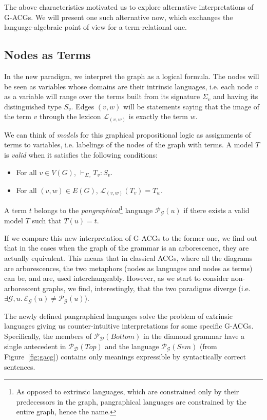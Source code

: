 \documentclass{llncs}
\begin{document}
The above characteristics motivated us to explore alternative interpretations
of G-ACGs. We will present one such alternative now, which exchanges the
language-algebraic point of view for a term-relational one.

\subsection{Nodes as Terms}

In the new paradigm, we interpret the graph as a logical formula. The nodes
will be seen as variables whose domains are their intrinsic languages,
i.e. each node $v$ as a variable will range over the terms built from its
signature $\Sigma_v$ and having its distinguished type $S_v$. Edges $(v,w)$
will be statements saying that the image of the term $v$ through the lexicon
$\mathcal{L}_{(v,w)}$ is exactly the term $w$.

We can think of \emph{models} for this graphical propositional logic as
assignments of terms to variables, i.e. labelings of the nodes of the graph
with terms. A model $T$ is \emph{valid} when it satisfies the following
conditions:

\begin{itemize}
  \item For all $v \in V(G)$, $\vdash_{\Sigma_v} T_v : S_v$.
  \item For all $(v,w) \in E(G)$, $\mathcal{L}_{(v,w)}(T_v) = T_w$.
\end{itemize}

A term $t$ belongs to the \emph{pangraphical}\footnote{As opposed to extrinsic
  languages, which are constrained only by their predecessors in the graph,
  pangraphical languages are constrained by the entire graph, hence the name.}
language $\mathcal{P}_{\mathcal{G}}(u)$ if there exists a valid model $T$ such
that $T(u) = t$.

If we compare this new interpretation of G-ACGs to the former one, we find out
that in the cases when the graph of the grammar is an arborescence, they are
actually equivalent. This means that in classical ACGs, where all the diagrams
are arborescences, the two metaphors (nodes as languages and nodes as terms)
can be, and are, used interchangeably. However, as we start to consider
non-arborescent graphs, we find, interestingly, that the two paradigms diverge
(i.e. $\exists \mathcal{G}, u.\ \mathcal{E}_{\mathcal{G}}(u) \neq
\mathcal{P}_{\mathcal{G}}(u)$).

The newly defined pangraphical languages solve the problem of extrinsic
languages giving us counter-intuitive interpretations for some specific
G-ACGs. Specifically, the members of $\mathcal{P}_{\mathcal{D}}(Bottom)$ in
the diamond grammar have a single antecedent in
$\mathcal{P}_{\mathcal{D}}(Top)$ and the language
$\mathcal{P}_{\mathcal{G}}(Sem)$ (from Figure~\ref{fig:gacg}) contains only
meanings expressible by syntactically correct sentences.
\end{document}
